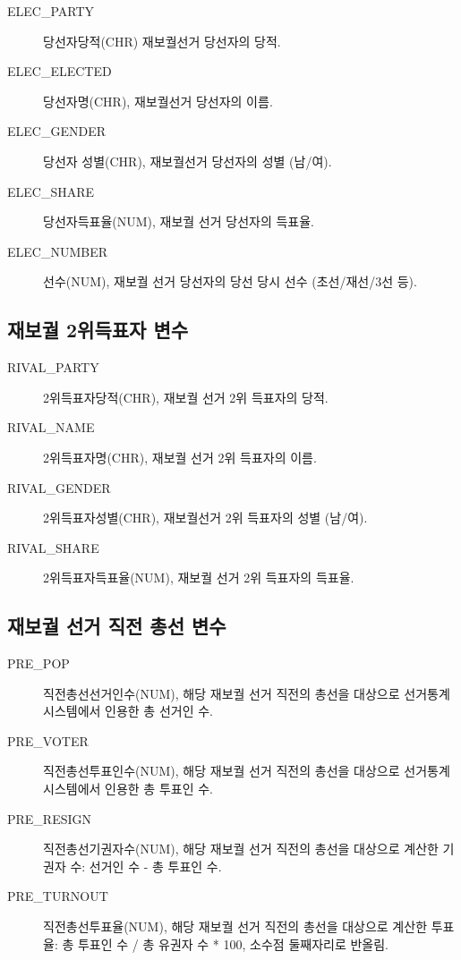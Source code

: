 \documentclass[
  11pt,
  letter]{article}
\begin{document}
\begin{description}
\item[ELEC\_PARTY]
당선자당적(CHR) 재보궐선거 당선자의 당적.
\item[ELEC\_ELECTED]
당선자명(CHR), 재보궐선거 당선자의 이름.
\item[ELEC\_GENDER]
당선자 성별(CHR), 재보궐선거 당선자의 성별 (남/여).
\item[ELEC\_SHARE]
당선자득표율(NUM), 재보궐 선거 당선자의 득표율.
\item[ELEC\_NUMBER]
선수(NUM), 재보궐 선거 당선자의 당선 당시 선수 (초선/재선/3선 등).
\end{description}

\hypertarget{uxc7acuxbcf4uxad90-2uxc704uxb4dduxd45cuxc790-uxbcc0uxc218}{%
\subsection{재보궐 2위득표자
변수}\label{uxc7acuxbcf4uxad90-2uxc704uxb4dduxd45cuxc790-uxbcc0uxc218}}

\begin{description}
\item[RIVAL\_PARTY]
2위득표자당적(CHR), 재보궐 선거 2위 득표자의 당적.
\item[RIVAL\_NAME]
2위득표자명(CHR), 재보궐 선거 2위 득표자의 이름.
\item[RIVAL\_GENDER]
2위득표자성별(CHR), 재보궐선거 2위 득표자의 성별 (남/여).
\item[RIVAL\_SHARE]
2위득표자득표율(NUM), 재보궐 선거 2위 득표자의 득표율.
\end{description}

\hypertarget{uxc7acuxbcf4uxad90-uxc120uxac70-uxc9c1uxc804-uxcd1duxc120-uxbcc0uxc218}{%
\subsection{재보궐 선거 직전 총선
변수}\label{uxc7acuxbcf4uxad90-uxc120uxac70-uxc9c1uxc804-uxcd1duxc120-uxbcc0uxc218}}

\begin{description}
\item[PRE\_POP]
직전총선선거인수(NUM), 해당 재보궐 선거 직전의 총선을 대상으로
선거통계시스템에서 인용한 총 선거인 수.
\item[PRE\_VOTER]
직전총선투표인수(NUM), 해당 재보궐 선거 직전의 총선을 대상으로
선거통계시스템에서 인용한 총 투표인 수.
\item[PRE\_RESIGN]
직전총선기권자수(NUM), 해당 재보궐 선거 직전의 총선을 대상으로 계산한
기권자 수: 선거인 수 - 총 투표인 수.
\item[PRE\_TURNOUT]
직전총선투표율(NUM), 해당 재보궐 선거 직전의 총선을 대상으로 계산한
투표율: 총 투표인 수 / 총 유권자 수 * 100, 소수점 둘째자리로 반올림.
\end{description}
\end{document}
